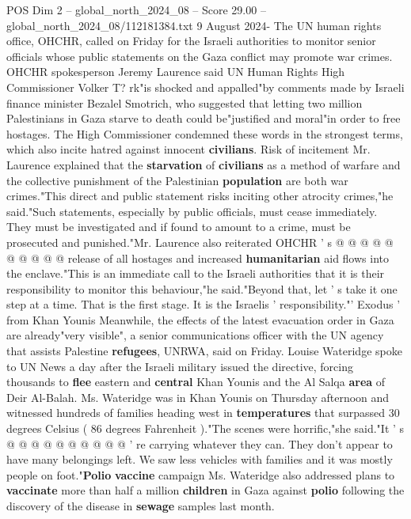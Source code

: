 \begin{textsample}{POS Dim 2 – global\_north\_2024\_08 – Score 29.00 – global\_north\_2024\_08/112181384.txt}  \label{ex:f2_pos_393}
9 August 2024- The UN human rights office, OHCHR, called on Friday for the Israeli authorities to monitor senior officials whose public statements on the Gaza conflict may promote war crimes.
OHCHR spokesperson Jeremy Laurence said UN Human Rights High Commissioner Volker T? rk"is shocked and appalled"by comments made by Israeli finance minister Bezalel Smotrich, who suggested that letting two million Palestinians in Gaza starve to death could be"justified and moral"in order to free hostages.
The High Commissioner condemned these words in the strongest terms, which also incite hatred against innocent \textbf{civilians}.
Risk of incitement Mr.
Laurence explained that the \textbf{starvation} of \textbf{civilians} as a method of warfare and the collective punishment of the Palestinian \textbf{population} are both war crimes."This direct and public statement risks inciting other atrocity crimes,"he said."Such statements, especially by public officials, must cease immediately.
They must be investigated and if found to amount to a crime, must be prosecuted and punished."Mr.
Laurence also reiterated OHCHR ' s @ @ @ @ @ @ @ @ @ @ release of all hostages and increased \textbf{humanitarian} aid flows into the enclave."This is an immediate call to the Israeli authorities that it is their responsibility to monitor this behaviour,"he said."Beyond that, let ' s take it one step at a time.
That is the first stage.
It is the Israelis ' responsibility."' Exodus ' from Khan Younis Meanwhile, the effects of the latest evacuation order in Gaza are already"very visible", a senior communications officer with the UN agency that assists Palestine \textbf{refugees}, UNRWA, said on Friday.
Louise Wateridge spoke to UN News a day after the Israeli military issued the directive, forcing thousands to \textbf{flee} eastern and \textbf{central} Khan Younis and the Al Salqa \textbf{area} of Deir Al-Balah.
Ms.
Wateridge was in Khan Younis on Thursday afternoon and witnessed hundreds of families heading west in \textbf{temperatures} that surpassed 30 degrees Celsius ( 86 degrees Fahrenheit )."The scenes were horrific,"she said."It ' s @ @ @ @ @ @ @ @ @ @ ' re carrying whatever they can.
They don't appear to have many belongings left.
We saw less vehicles with families and it was mostly people on foot."\textbf{Polio} \textbf{vaccine} campaign Ms.
Wateridge also addressed plans to \textbf{vaccinate} more than half a million \textbf{children} in Gaza against \textbf{polio} following the discovery of the disease in \textbf{sewage} samples last month.

\end{textsample}
